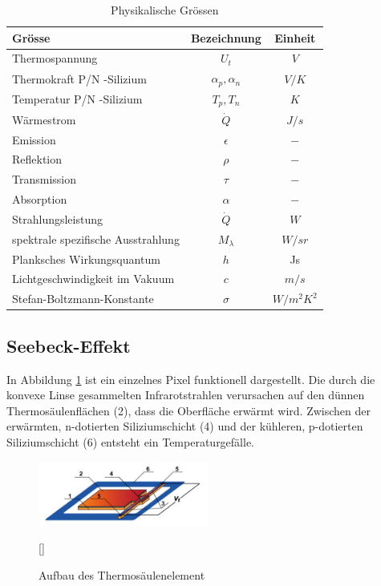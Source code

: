 \begin{table}[H]
	\centering
	\begin{tabular}{l|c|c}
		\rowcolor{gray} Grösse &  Bezeichnung  & Einheit \\
		\hline 
		Thermospannung &  $ U_{t}$ & $V$  \\ 
		\rowcolor{gray} Thermokraft P/N -Silizium  & $\alpha_{p},\alpha_{n}$ & $V/K$\\	
		Temperatur P/N -Silizium &  $T_{p},T_{n}$ & $K$ \\
		\rowcolor{gray}Wärmestrom &  $\dot{Q}$ & $J/s$  \\ 
		Emission & $\epsilon$ & $-$\\	
		\rowcolor{gray}Reflektion &  $\rho $ & $-$ \\
		Transmission & $\tau$ & $-$\\
		\rowcolor{gray}Absorption &  $\alpha$ & $-$  \\ 
		Strahlungsleistung & $\dot{Q}$ & $W$\\
		\rowcolor{gray}spektrale spezifische Ausstrahlung &  $M_{\lambda }$ & $W/sr$  \\
		Planksches Wirkungsquantum &  $ h$ & Js \\ 
		\rowcolor{gray} Lichtgeschwindigkeit im Vakuum & $c $ & $ m/s$ \\ 
 		Stefan-Boltzmann-Konstante & $\sigma$ & $ W/m^2K^2 $ \\ 
	\end{tabular}
	\caption{Physikalische Grössen }
	\label{tab:Legende Physikalische Grössen} 
\end{table}

\subsection{Seebeck-Effekt}
\label{subsec:seebeck}
In Abbildung \ref{fig:AufbauThermo} ist ein einzelnes Pixel funktionell dargestellt. Die durch die konvexe Linse gesammelten Infrarotstrahlen verursachen auf den dünnen Thermosäulenflächen (2), dass die Oberfläche erwärmt wird. Zwischen der erwärmten, n-dotierten Siliziumschicht (4) und der kühleren, p-dotierten Siliziumschicht (6) entsteht ein Temperaturgefälle.   

\begin{figure}[H]
	\centering
	\includegraphics[width=0.5\textwidth]
	{fig/Mems_Thermopile.PNG}
	\caption[Aufbau Thermosäulenelement]{Aufbau des Thermosäulenelement} [\protect\cite{AMG8834}]
	\label{fig:AufbauThermo}
\end{figure}

